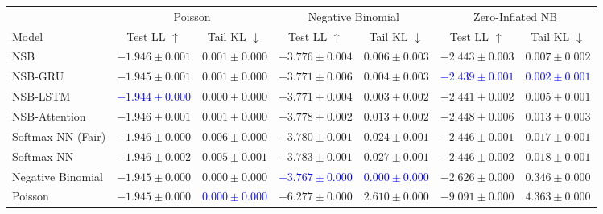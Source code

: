 \begin{tabular}{lcccccc}
\toprule
 & \multicolumn{2}{c}{Poisson} & \multicolumn{2}{c}{Negative Binomial} & \multicolumn{2}{c}{Zero-Inflated NB} \\
\cmidrule(lr){2-3} \cmidrule(lr){4-5} \cmidrule(lr){6-7} 
Model & Test LL $\uparrow$ & Tail KL $\downarrow$ & Test LL $\uparrow$ & Tail KL $\downarrow$ & Test LL $\uparrow$ & Tail KL $\downarrow$ \\
\midrule
NSB & $-1.946 \pm 0.001$ & $0.001 \pm 0.000$ & $-3.776 \pm 0.004$ & $0.006 \pm 0.003$ & $-2.443 \pm 0.003$ & $0.007 \pm 0.002$ \\
NSB-GRU & $-1.945 \pm 0.001$ & $0.001 \pm 0.000$ & $-3.771 \pm 0.006$ & $0.004 \pm 0.003$ & \textcolor{blue}{\textbf{$-2.439 \pm 0.001$}} & \textcolor{blue}{\textbf{$0.002 \pm 0.001$}} \\
NSB-LSTM & \textcolor{blue}{\textbf{$-1.944 \pm 0.000$}} & $0.000 \pm 0.000$ & $-3.771 \pm 0.004$ & $0.003 \pm 0.002$ & $-2.441 \pm 0.002$ & $0.005 \pm 0.001$ \\
NSB-Attention & $-1.946 \pm 0.001$ & $0.001 \pm 0.000$ & $-3.778 \pm 0.002$ & $0.013 \pm 0.002$ & $-2.448 \pm 0.006$ & $0.013 \pm 0.003$ \\
Softmax NN (Fair) & $-1.946 \pm 0.000$ & $0.006 \pm 0.000$ & $-3.780 \pm 0.001$ & $0.024 \pm 0.001$ & $-2.446 \pm 0.001$ & $0.017 \pm 0.001$ \\
Softmax NN & $-1.946 \pm 0.002$ & $0.005 \pm 0.001$ & $-3.783 \pm 0.001$ & $0.027 \pm 0.001$ & $-2.446 \pm 0.002$ & $0.018 \pm 0.001$ \\
Negative Binomial & $-1.945 \pm 0.000$ & $0.000 \pm 0.000$ & \textcolor{blue}{\textbf{$-3.767 \pm 0.000$}} & \textcolor{blue}{\textbf{$0.000 \pm 0.000$}} & $-2.626 \pm 0.000$ & $0.346 \pm 0.000$ \\
Poisson & $-1.945 \pm 0.000$ & \textcolor{blue}{\textbf{$0.000 \pm 0.000$}} & $-6.277 \pm 0.000$ & $2.610 \pm 0.000$ & $-9.091 \pm 0.000$ & $4.363 \pm 0.000$ \\
\bottomrule
\end{tabular}